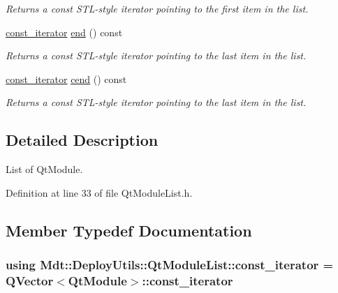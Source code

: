 \begin{DoxyCompactItemize}
\begin{DoxyCompactList}\small\item\em Returns a const S\+T\+L-\/style iterator pointing to the first item in the list. \end{DoxyCompactList}\item 
\hyperlink{class_mdt_1_1_deploy_utils_1_1_qt_module_list_ad6f5d3797918d10ffcce59cf37fcd86f}{const\+\_\+iterator} \hyperlink{class_mdt_1_1_deploy_utils_1_1_qt_module_list_ae6eb25e9f98e70ccd85a763d4ba188fd}{end} () const 
\begin{DoxyCompactList}\small\item\em Returns a const S\+T\+L-\/style iterator pointing to the last item in the list. \end{DoxyCompactList}\item 
\hyperlink{class_mdt_1_1_deploy_utils_1_1_qt_module_list_ad6f5d3797918d10ffcce59cf37fcd86f}{const\+\_\+iterator} \hyperlink{class_mdt_1_1_deploy_utils_1_1_qt_module_list_ac6794cb4cc68f4218cd8b71c92f09479}{cend} () const 
\begin{DoxyCompactList}\small\item\em Returns a const S\+T\+L-\/style iterator pointing to the last item in the list. \end{DoxyCompactList}\end{DoxyCompactItemize}


\subsection{Detailed Description}
List of Qt\+Module. 

Definition at line 33 of file Qt\+Module\+List.\+h.



\subsection{Member Typedef Documentation}
\subsubsection[{\texorpdfstring{const\+\_\+iterator}{const_iterator}}]{\setlength{\rightskip}{0pt plus 5cm}using {\bf Mdt\+::\+Deploy\+Utils\+::\+Qt\+Module\+List\+::const\+\_\+iterator} =  Q\+Vector$<$Qt\+Module$>$\+::{\bf const\+\_\+iterator}}\hypertarget{class_mdt_1_1_deploy_utils_1_1_qt_module_list_ad6f5d3797918d10ffcce59cf37fcd86f}{}\label{class_mdt_1_1_deploy_utils_1_1_qt_module_list_ad6f5d3797918d10ffcce59cf37fcd86f}


